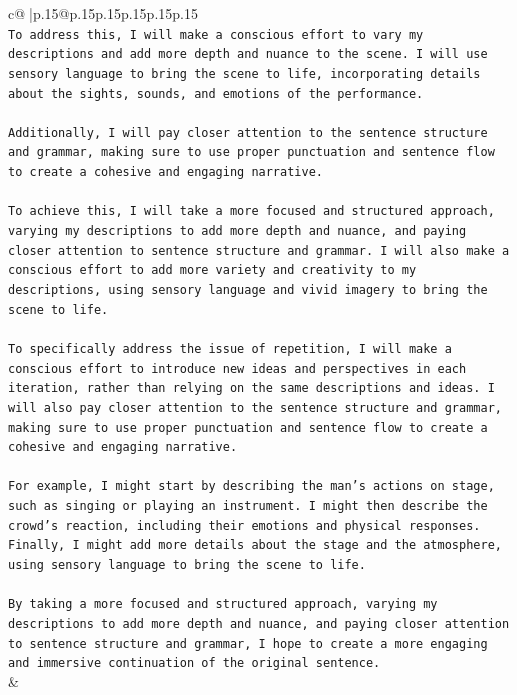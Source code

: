 \documentclass{article}
\begin{document}
{\begin{supertabular}{c@{$\;$}|p{.15\linewidth}@{}p{.15\linewidth}p{.15\linewidth}p{.15\linewidth}p{.15\linewidth}p{.15\linewidth}}
{{{\\ 
\texttt{To address this, I will make a conscious effort to vary my descriptions and add more depth and nuance to the scene. I will use sensory language to bring the scene to life, incorporating details about the sights, sounds, and emotions of the performance.} \\
\\ 
\texttt{Additionally, I will pay closer attention to the sentence structure and grammar, making sure to use proper punctuation and sentence flow to create a cohesive and engaging narrative.} \\
\\ 
\texttt{To achieve this, I will take a more focused and structured approach, varying my descriptions to add more depth and nuance, and paying closer attention to sentence structure and grammar. I will also make a conscious effort to add more variety and creativity to my descriptions, using sensory language and vivid imagery to bring the scene to life.} \\
\\ 
\texttt{To specifically address the issue of repetition, I will make a conscious effort to introduce new ideas and perspectives in each iteration, rather than relying on the same descriptions and ideas. I will also pay closer attention to the sentence structure and grammar, making sure to use proper punctuation and sentence flow to create a cohesive and engaging narrative.} \\
\\ 
\texttt{For example, I might start by describing the man's actions on stage, such as singing or playing an instrument. I might then describe the crowd's reaction, including their emotions and physical responses. Finally, I might add more details about the stage and the atmosphere, using sensory language to bring the scene to life.} \\
\\ 
\texttt{By taking a more focused and structured approach, varying my descriptions to add more depth and nuance, and paying closer attention to sentence structure and grammar, I hope to create a more engaging and immersive continuation of the original sentence.} \\
            }
        }
    }
    & \\ \\

\end{supertabular}
}
\end{document}
